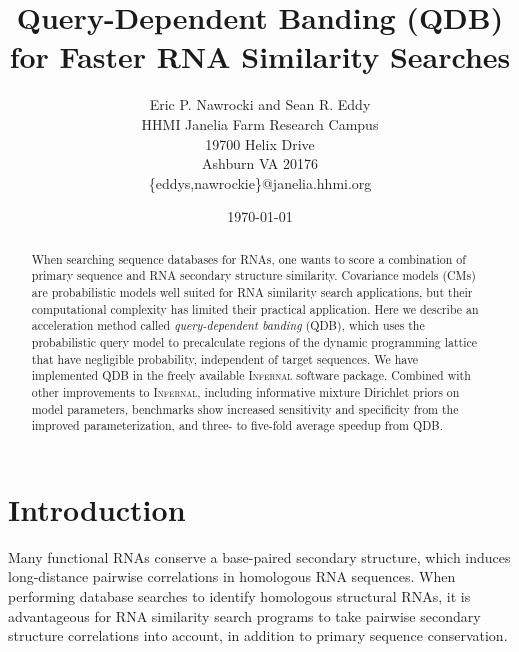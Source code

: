 \documentclass[11pt]{article}
\begin{document}
\title{Query-Dependent Banding (QDB) for Faster RNA Similarity Searches}
\author{Eric P. Nawrocki and Sean R. Eddy\\
HHMI Janelia Farm Research Campus\\
19700 Helix Drive\\
Ashburn VA 20176\\
\{eddys,nawrockie\}@janelia.hhmi.org}  
\date{\today}
\maketitle




\begin{abstract}

When searching sequence databases for RNAs,
one wants to score a combination of primary sequence and RNA secondary
structure similarity.  Covariance models (CMs) are probabilistic
models well suited for RNA similarity search applications, but their
computational complexity has limited their practical
application. Here we describe an acceleration method called
\emph{query-dependent banding} (QDB), which uses the probabilistic
query model to precalculate regions of the dynamic programming lattice
that have negligible probability, independent of target 
sequences. We have implemented QDB in the freely available
\textsc{Infernal} software package. Combined with other improvements
to \textsc{Infernal}, including informative mixture Dirichlet priors
on model parameters, benchmarks show increased
sensitivity and specificity from the improved parameterization, and
three- to five-fold average speedup from QDB.

\end{abstract}





\section{Introduction}

Many functional RNAs conserve a base-paired secondary structure, which
induces long-distance pairwise
correlations in homologous RNA sequences.  When
performing database searches to identify homologous structural RNAs, it is
advantageous for RNA similarity search programs to take pairwise
secondary structure correlations into account, in addition to primary
sequence conservation.
\end{document}
